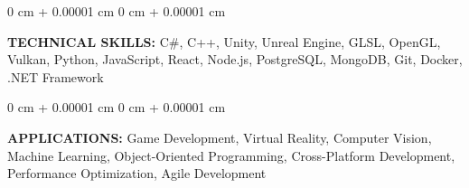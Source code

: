 \documentclass[10pt, letterpaper]{article}
\newenvironment{onecolentry}{
    \begin{adjustwidth}{
        0 cm + 0.00001 cm
    }{
        0 cm + 0.00001 cm
    }
}{
    \end{adjustwidth}
} %
\begin{document}
        \vspace{0.2 cm}

\begin{onecolentry}
    \textbf{TECHNICAL SKILLS:} C\#, C++, Unity, Unreal Engine, GLSL, OpenGL, Vulkan, Python, JavaScript, React, Node.js, PostgreSQL, MongoDB, Git, Docker, .NET Framework
\end{onecolentry}
\vspace{0.2 cm}
\begin{onecolentry}
    \textbf{APPLICATIONS:} Game Development, Virtual Reality, Computer Vision, Machine Learning, Object-Oriented Programming, Cross-Platform Development, Performance Optimization, Agile Development
\end{onecolentry}
  
\end{document}

